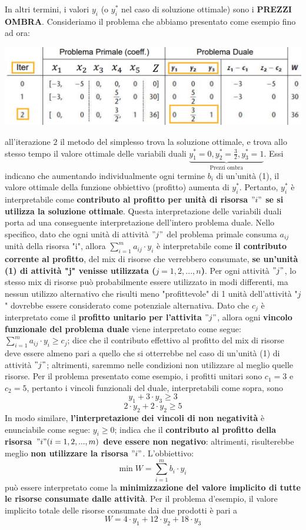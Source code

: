 \documentclass[12pt]{article}
\begin{document}
In altri termini, i valori $y_i$ (o $y_i^*$ nel caso di soluzione ottimale) sono i \textbf{PREZZI OMBRA}.
Consideriamo il problema che abbiamo presentato come esempio fino ad ora: 
\begin{center}
    \includegraphics[width = 1\linewidth]{Images/49.png}
\end{center}
\noindent
all'iterazione $2$ il metodo del simplesso trova la soluzione ottimale, e trova allo stesso tempo il valore ottimale delle variabili duali
$\underbrace{y_1^* = 0, y_2^* = \frac{3}{2}, y_3^* = 1}_{\textrm{Prezzi ombra}}$.
Essi indicano che aumentando individualmente ogni termine $b_i$ di un'unità (1), il valore ottimale della funzione obbiettivo (profitto) aumenta di $y_i^*$.
Pertanto, $y_i^*$ è interpretabile come \textbf{contributo al profitto per unità di risorsa $"i"$ se si utilizza la soluzione ottimale}.
Questa interpretazione delle variabili duali porta ad una conseguente interpretazione dell'intero problema duale. Nello specifico, dato che ogni unità di attività $"j"$ del problema
primale consuma $a_{ij}$ unità della risorsa "i", allora $\sum_{i=1}^m a_{ij} \cdot y_i$ è interpretabile come \textbf{il contributo corrente al profitto}, del mix di risorse che verrebbero consumate,
\textbf{se un'unità (1) di attività "j" venisse utilizzata ($j = 1, 2, ..., n$)}.
Per ogni attività $"j"$, lo stesso mix di risorse può probabilmente essere utilizzato in modi differenti, ma nessun utilizzo alternativo che risulti meno "profittevole" di 1 unità dell'attività "$j$" dovrebbe essere
considerato come potenziale alternativa. Dato che $c_j$ è interpretato come il \textbf{profitto unitario per l'attivita $"j"$}, allora ogni \textbf{vincolo funzionale del problema duale} viene interpretato come segue:
$\sum_{i=1}^{m} a_{ij} \cdot y_i \geq c_j$; dice che il contributo effettivo al profitto del mix di risorse deve essere almeno pari a quello che si otterrebbe nel caso di un'unità (1) di attività $"j"$; altrimenti, saremmo
nelle condizioni non utilizzare al meglio quelle risorse.
Per il problema presentato come esempio, i profitti unitari sono $c_1 =3$ e $c_2 = 5$, pertanto i vincoli funzionali del duale, interpretabili come sopra, sono
$$y_1 + 3 \cdot y_3 \geq 3$$
$$2 \cdot y_2 + 2 \cdot y_2 \geq 5$$
In modo similare, \textbf{l'interpretazione dei vincoli di non negatività} è enunciabile come segue:
$y_i \geq 0$; indica che il \textbf{contributo al profitto della risorsa $"i" (i = 1, 2, ..., m)$ deve essere non negativo}: altrimenti, risulterebbe meglio \textbf{non utilizzare la risorsa $"i"$}.
L'obbiettivo:
$$\textrm{min} \; W = \sum_{i=1}^{m}b_i \cdot y_i$$
può essere interpretato come la \textbf{minimizzazione del valore implicito di tutte le risorse consumate dalle attività}. Per il problema d'esempio, il valore implicito totale delle risorse consumate dai due prodotti è pari a
$$W = 4 \cdot y_1 + 12 \cdot y_2 + 18 \cdot y_3$$
\end{document}
